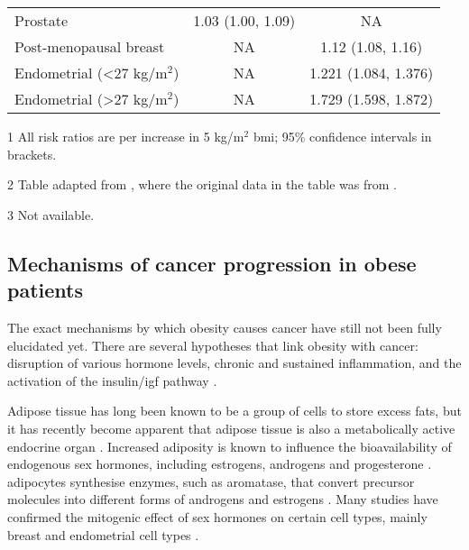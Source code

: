 \begin{table}[htb]
\begin{threeparttable}
\begin{tabular}{lcc}
			Prostate                                & 1.03 (1.00, 1.09) & NA\\
			Post-menopausal breast                  & NA                & 1.12 (1.08, 1.16)\\
			Endometrial (\textless{}27 kg/m$^2$)    & NA                & 1.221 (1.084, 1.376)\\
			Endometrial (\textgreater{}27 kg/m$^2$) & NA                & 1.729 (1.598, 1.872)\\
			\hline
			\hline
		\end{tabular}
		\begin{tablenotes}
			\begin{footnotesize}
				\item [1] All risk ratios are per increase in 5 kg/m$^2$ \gls{bmi}; 95\% confidence intervals in brackets.
				\item [2] Table adapted from \citet{Roberts2010}, where the original data in the table was from \citet{Renehan2008}.
				\item [3] Not available.
			\end{footnotesize}
		\end{tablenotes}
	\end{threeparttable}
\end{table}

\subsection{Mechanisms of cancer progression in obese patients}
\label{sub:mechanisms_of_cancer_progression_in_obese_patient}

The exact mechanisms by which obesity causes cancer have still not been fully elucidated yet.
There are several hypotheses that link obesity with cancer: disruption of various hormone levels, chronic and sustained inflammation, and the activation of the insulin/\gls{igf} pathway \citep{Lumeng2011,Roberts2010}.

Adipose tissue has long been known to be a group of cells to store excess fats, but it has recently become apparent that adipose tissue is also a metabolically active endocrine organ \citep{Roberts2010}.
Increased adiposity is known to influence the bioavailability of endogenous sex hormones, including estrogens, androgens and progesterone \citep{Calle2004}.
\Glspl{adipocyte} synthesise enzymes, such as aromatase, that convert precursor molecules into different forms of androgens and estrogens \citep{Calle2004}.
Many studies have confirmed the mitogenic effect of sex hormones on certain cell types, mainly breast and endometrial cell types \citep{Roberts2010}.

